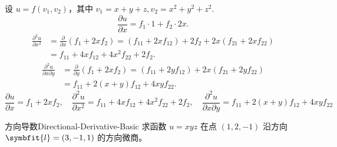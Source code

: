 \begin{solution}

    设 $u = f(v_1, v_2)$，其中 $v_1 = x+y+z, v_2 = x^2+y^2+z^2$.
    \begin{equation}
        \frac{\partial u}{\partial x} = f_1 \cdot 1 + f_2 \cdot 2x.
    \end{equation}
    \begin{equation}
        \begin{aligned}
            \frac{\partial^2 u}{\partial x^2} & = \frac{\partial}{\partial x} (f_1 + 2x f_2) = (f_{11} + 2x f_{12}) + 2 f_2 + 2x (f_{21} + 2x f_{22}) \\
                                              & = f_{11} + 4x f_{12} + 4x^2 f_{22} + 2f_2.
        \end{aligned}
    \end{equation}
    \begin{equation}
        \begin{aligned}
            \frac{\partial^2 u}{\partial x \partial y} & = \frac{\partial}{\partial y} (f_1 + 2x f_2) = (f_{11} + 2y f_{12}) + 2x (f_{21} + 2y f_{22}) \\
                                                       & = f_{11} + 2(x+y) f_{12} + 4xy f_{22}.
        \end{aligned}
    \end{equation}
    \begin{equation}
        \boxed{\frac{\partial u}{\partial x} = f_1 + 2x f_2, \quad \frac{\partial^2 u}{\partial x^2} = f_{11} + 4x f_{12} + 4x^2 f_{22} + 2f_2, \quad \frac{\partial^2 u}{\partial x \partial y} = f_{11} + 2(x+y) f_{12} + 4xy f_{22}}
    \end{equation}
\end{solution}


\begin{problem}{方向导数}{Directional-Derivative-Basic}
    求函数 $u = xyz$ 在点 $(1, 2, -1)$ 沿方向 $\symbfit{l} = (3, -1, 1)$ 的方向微商。
\end{problem}

